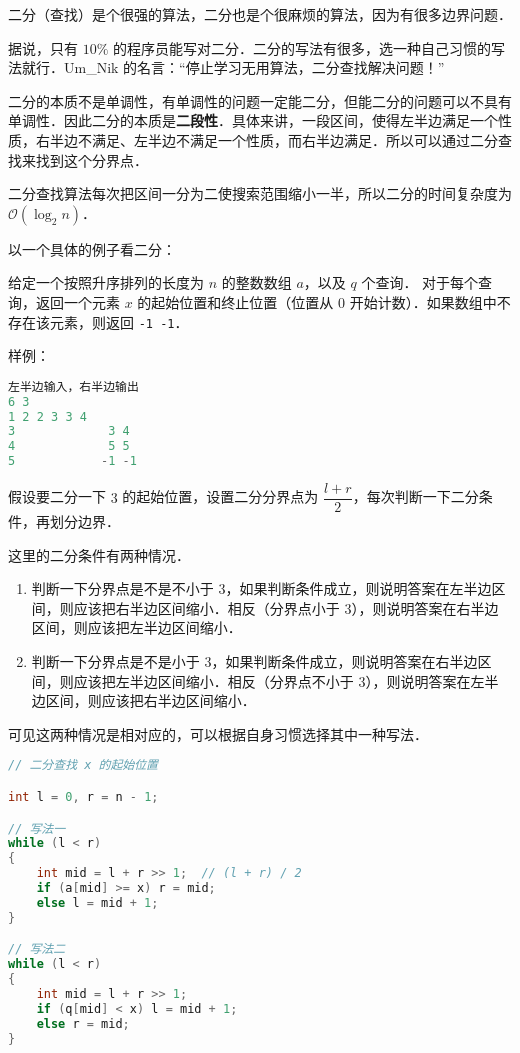
二分（查找）是个很强的算法，二分也是个很麻烦的算法，因为有很多边界问题．

据说，只有 $10 \%$ 的程序员能写对二分．二分的写法有很多，选一种自己习惯的写法就行．Um\_Nik 的名言：“停止学习无用算法，二分查找解决问题！”

二分的本质不是单调性，有单调性的问题一定能二分，但能二分的问题可以不具有单调性．因此二分的本质是\textbf{二段性}．具体来讲，一段区间，使得左半边满足一个性质，右半边不满足、左半边不满足一个性质，而右半边满足．所以可以通过二分查找来找到这个分界点．

二分查找算法每次把区间一分为二使搜索范围缩小一半，所以二分的时间复杂度为 $\mathcal{O}(\log_2 n)$．

以一个具体的例子看二分：

给定一个按照升序排列的长度为 $n$ 的整数数组 $a$，以及 $q$ 个查询．
对于每个查询，返回一个元素 $x$ 的起始位置和终止位置（位置从 $0$ 开始计数）．如果数组中不存在该元素，则返回 \verb|-1 -1|．

样例：
\begin{lstlisting}[language=cpp]
左半边输入，右半边输出
6 3
1 2 2 3 3 4
3             3 4
4             5 5
5            -1 -1
\end{lstlisting}

假设要二分一下 $3$ 的起始位置，设置二分分界点为 $\dfrac{l+r}{2}$，每次判断一下二分条件，再划分边界．

这里的二分条件有两种情况．

\begin{enumerate}
\item 判断一下分界点是不是不小于 $3$，如果判断条件成立，则说明答案在左半边区间，则应该把右半边区间缩小．相反（分界点小于 $3$），则说明答案在右半边区间，则应该把左半边区间缩小．
\item 判断一下分界点是不是小于 $3$，如果判断条件成立，则说明答案在右半边区间，则应该把左半边区间缩小．相反（分界点不小于 $3$），则说明答案在左半边区间，则应该把右半边区间缩小．
\end{enumerate}
可见这两种情况是相对应的，可以根据自身习惯选择其中一种写法．

\begin{lstlisting}[language=cpp]
// 二分查找 x 的起始位置

int l = 0, r = n - 1;

// 写法一
while (l < r)
{
	int mid = l + r >> 1;  // (l + r) / 2
    if (a[mid] >= x) r = mid;
    else l = mid + 1;
}

// 写法二
while (l < r)
{
    int mid = l + r >> 1;
    if (q[mid] < x) l = mid + 1;
    else r = mid;
}
\end{lstlisting}

